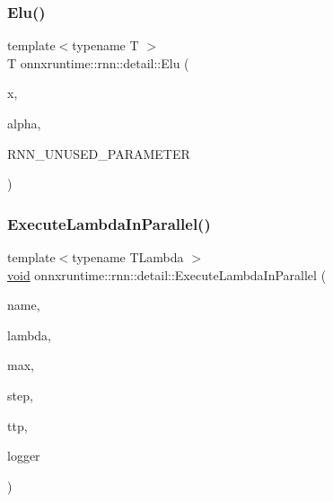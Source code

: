 \mbox{\label{namespaceonnxruntime_1_1rnn_1_1detail_a8ee9d7ee665498c10ffcc34b97e3aa4e}} 
\subsubsection{\texorpdfstring{Elu()}{Elu()}}
{\footnotesize\ttfamily template$<$typename T $>$ \\
T onnxruntime\+::rnn\+::detail\+::\+Elu (\begin{DoxyParamCaption}\item[{T}]{x,  }\item[{T}]{alpha,  }\item[{T \mbox{\hyperlink{mlasi_8h_a5fd37d216981b4cd9a19e29b5acd48d4}{beta}}}]{R\+N\+N\+\_\+\+U\+N\+U\+S\+E\+D\+\_\+\+P\+A\+R\+A\+M\+E\+T\+ER }\end{DoxyParamCaption})\hspace{0.3cm}{\ttfamily [inline]}}

\mbox{\label{namespaceonnxruntime_1_1rnn_1_1detail_acd48e2c1247f45a983b648dc0d973725}} 
\subsubsection{\texorpdfstring{Execute\+Lambda\+In\+Parallel()}{ExecuteLambdaInParallel()}}
{\footnotesize\ttfamily template$<$typename T\+Lambda $>$ \\
\mbox{\hyperlink{mlasi_8h_a88f941d423cb2a819b70a1358982b1a6}{void}} onnxruntime\+::rnn\+::detail\+::\+Execute\+Lambda\+In\+Parallel (\begin{DoxyParamCaption}\item[{const std\+::string \&}]{name,  }\item[{T\+Lambda}]{lambda,  }\item[{int}]{max,  }\item[{int}]{step,  }\item[{\mbox{\hyperlink{classonnxruntime_1_1TaskThreadPool}{Task\+Thread\+Pool}} \&}]{ttp,  }\item[{const \+::\mbox{\hyperlink{classonnxruntime_1_1logging_1_1Logger}{onnxruntime\+::logging\+::\+Logger}} \&}]{logger }\end{DoxyParamCaption})}

